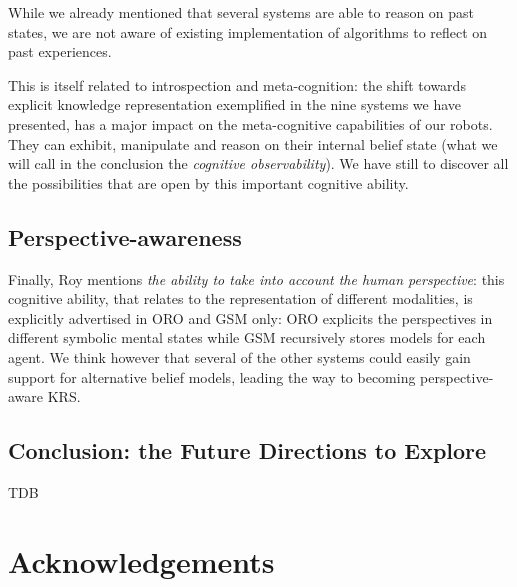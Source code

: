 \documentclass[journal]{IEEEtran}
\begin{document}
While we already mentioned that several systems are able to reason on past
states, we are not aware of existing implementation of algorithms to reflect on
past experiences.

This is itself related to introspection and meta-cognition: the shift towards
explicit knowledge representation exemplified in the nine systems we have
presented, has a major impact on the meta-cognitive capabilities of our robots.
They can exhibit, manipulate and reason on their internal belief state (what we
will call in the conclusion the \emph{cognitive observability}). We have still
to discover all the possibilities that are open by this important cognitive
ability.

\subsection{Perspective-awareness}

Finally, Roy mentions \emph{the ability to take into account the human
perspective}: this cognitive ability, that relates to the representation of
different modalities, is explicitly advertised in ORO and GSM only: ORO
explicits the perspectives in different symbolic mental states while GSM
recursively stores models for each agent.  We think however that several of the
other systems could easily gain support for alternative belief models, leading
the way to becoming perspective-aware KRS.

\subsection{Conclusion: the Future Directions to Explore}

TDB

\section*{Acknowledgements} 




\end{document}
